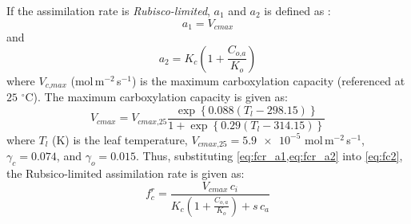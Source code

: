 If the assimilation rate is \textit{Rubisco-limited}, $a_1$ and $a_2$ is defined as \citep{Manoli2014,Katul2010}:
\begin{equation}
a_1 = V_{\textit{cmax}}
\label{eq:fcr_a1}
\end{equation} 
and
\begin{equation}
a_2 = K_c \left(1 + \frac{C_{\textit{o,a}}}{K_o}\right)
\label{eq:fcr_a2}
\end{equation} 
where $V_{\textit{c,max}}$ (mol\,m$^{-2}$\,s$^{-1}$) is the maximum carboxylation capacity (referenced at $25$ $^{\circ}$C). The maximum carboxylation capacity is given as:
\begin{equation}
V_{\textit{cmax}} = V_{\textit{cmax,25}} \frac{ \exp\left\{ 0.088 \left(T_l - 298.15\right)\right\} }{1 + \exp\left\{0.29\left(T_l - 314.15\right)\right\} }
\end{equation}
where $T_l$ (K) is the leaf temperature, $V_{\textit{cmax,25}} = \num{5.9e-5}$ mol\,m$^{-2}$\,s$^{-1}$,
$\gamma_c = 0.074$, and $\gamma_o = 0.015$. Thus, substituting \cref{eq:fcr_a1,eq:fcr_a2} into \cref{eq:fc2}, the Rubsico-limited assimilation rate is given as:
\begin{equation}
f_c^r = \frac{V_{\textit{cmax}}\,c_i}{K_c \left(1 + \frac{C_{o,a}}{K_o}\right) + s\,c_a}
\end{equation}


